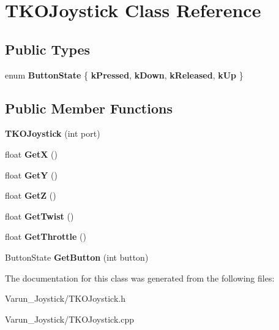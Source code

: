 \hypertarget{class_t_k_o_joystick}{\section{T\-K\-O\-Joystick Class Reference}
\label{class_t_k_o_joystick}
}
\subsection*{Public Types}
\begin{DoxyCompactItemize}
\item 
enum {\bfseries Button\-State} \{ {\bfseries k\-Pressed}, 
{\bfseries k\-Down}, 
{\bfseries k\-Released}, 
{\bfseries k\-Up}
 \}
\end{DoxyCompactItemize}
\subsection*{Public Member Functions}
\begin{DoxyCompactItemize}
\item 
\hypertarget{class_t_k_o_joystick_a21bb3898f3a71bf9f3c4b2d5dc832dae}{{\bfseries T\-K\-O\-Joystick} (int port)}\label{class_t_k_o_joystick_a21bb3898f3a71bf9f3c4b2d5dc832dae}

\item 
\hypertarget{class_t_k_o_joystick_a507118cf486913590f6a1d3e11d622f9}{float {\bfseries Get\-X} ()}\label{class_t_k_o_joystick_a507118cf486913590f6a1d3e11d622f9}

\item 
\hypertarget{class_t_k_o_joystick_a139451599618c0a34befc5a8b988dce3}{float {\bfseries Get\-Y} ()}\label{class_t_k_o_joystick_a139451599618c0a34befc5a8b988dce3}

\item 
\hypertarget{class_t_k_o_joystick_a0cc1799ca6c9b59561e0d86ae6a19132}{float {\bfseries Get\-Z} ()}\label{class_t_k_o_joystick_a0cc1799ca6c9b59561e0d86ae6a19132}

\item 
\hypertarget{class_t_k_o_joystick_ae1441786cf752d4f08dd95029366e656}{float {\bfseries Get\-Twist} ()}\label{class_t_k_o_joystick_ae1441786cf752d4f08dd95029366e656}

\item 
\hypertarget{class_t_k_o_joystick_ad16c2b9b93342089e200b90ebb6542be}{float {\bfseries Get\-Throttle} ()}\label{class_t_k_o_joystick_ad16c2b9b93342089e200b90ebb6542be}

\item 
\hypertarget{class_t_k_o_joystick_a7a50b878a2848261c4324b06d7a3af55}{Button\-State {\bfseries Get\-Button} (int button)}\label{class_t_k_o_joystick_a7a50b878a2848261c4324b06d7a3af55}

\end{DoxyCompactItemize}


The documentation for this class was generated from the following files\-:\begin{DoxyCompactItemize}
\item 
Varun\-\_\-\-Joystick/T\-K\-O\-Joystick.\-h\item 
Varun\-\_\-\-Joystick/T\-K\-O\-Joystick.\-cpp\end{DoxyCompactItemize}

